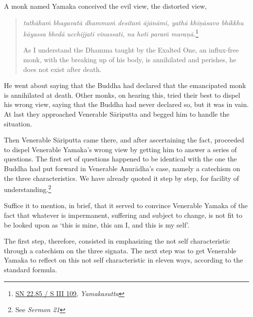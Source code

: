 A monk named Yamaka conceived the evil view, the distorted view,

\begin{quote}
\emph{tathāhaṁ bhagavatā dhammaṁ desitaṁ ājānāmi, yathā khīṇāsavo bhikkhu kāyassa bhedā ucchijjati vinassati, na hoti paraṁ maraṇā.}\footnote{\href{https://suttacentral.net/sn22.85/pli/ms}{SN 22.85 / S III 109}, \emph{Yamakasutta}}

As I understand the Dhamma taught by the Exalted One, an influx-free monk, with the breaking up of his body, is annihilated and perishes, he does not exist after death.
\end{quote}

He went about saying that the Buddha had declared that the emancipated monk is annihilated at death. Other monks, on hearing this, tried their best to dispel his wrong view, saying that the Buddha had never declared so, but it was in vain. At last they approached Venerable Sāriputta and begged him to handle the situation.

Then Venerable Sāriputta came there, and after ascertaining the fact, proceeded to dispel Venerable Yamaka's wrong view by getting him to answer a series of questions. The first set of questions happened to be identical with the one the Buddha had put forward in Venerable Anurādha's case, namely a catechism on the three characteristics. We have already quoted it step by step, for facility of understanding.\footnote{See \emph{Sermon 21}}

Suffice it to mention, in brief, that it served to convince Venerable Yamaka of the fact that whatever is impermanent, suffering and subject to change, is not fit to be looked upon as `this is mine, this am I, and this is my self'.

The first step, therefore, consisted in emphasizing the not self characteristic through a catechism on the three signata. The next step was to get Venerable Yamaka to reflect on this not self characteristic in eleven ways, according to the standard formula.

